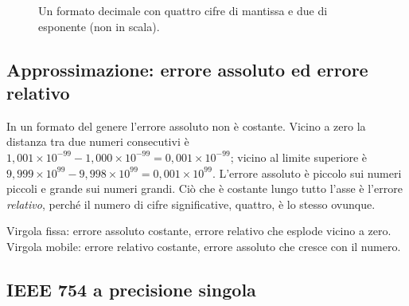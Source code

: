 \begin{figure}[htb]
\centering
{}
\caption{Un formato decimale con quattro cifre di mantissa e due di esponente
(non in scala).}
\label{fig:real:line}
\end{figure}

\subsection{Approssimazione: errore assoluto ed errore relativo}

In un formato del genere l'errore assoluto non è costante. Vicino a zero la
distanza tra due numeri consecutivi è
$1,001\times 10^{-99}-1,000\times 10^{-99} = 0,001\times 10^{-99}$; vicino al
limite superiore è
$9,999\times 10^{99}-9,998\times 10^{99} = 0,001\times 10^{99}$. L'errore
assoluto è piccolo sui numeri piccoli e grande sui numeri grandi. Ciò che è
costante lungo tutto l'asse è l'errore \emph{relativo}, perché il numero di
cifre significative, quattro, è lo stesso ovunque.

\begin{prgconcept}
Virgola fissa: errore assoluto costante, errore relativo che esplode vicino a
zero. Virgola mobile: errore relativo costante, errore assoluto che cresce con
il numero.
\end{prgconcept}

\subsection{IEEE 754 a precisione singola}

